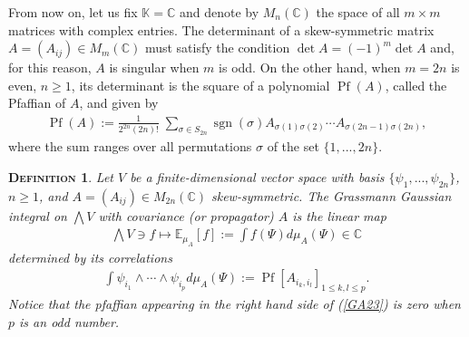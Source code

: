 \documentclass[12pt,twoside]{amsart}
\newcommand{\E}{{\mathbb{E}}}
\newtheorem{defi}{\textsc{Definition}}[section]
\numberwithin{equation}{section}
\begin{document}
From now on, let us fix $\mathbb{K} = \mathbb{C}$ and denote by $M_{n}(\mathbb{C})$ the space of all $m \times m$ matrices with complex entries. The determinant of a skew-symmetric matrix $A = (A_{ij}) \in M_{m}(\mathbb{C})$ must satisfy the condition $\det A = (-1)^{m}\det A$ and, for this reason, $A$ is singular when $m$ is odd. On the other hand, when $m=2n$ is even, $n \ge 1$, its determinant is the square of a polynomial $\operatorname{Pf}(A)$, called the Pfaffian of $A$, and given by
\begin{eqnarray}
\operatorname{Pf}(A) := \frac{1}{2^{2n}(2n)!}\;\sum_{\sigma \in S_{2n}}\operatorname{sgn}(\sigma)A_{\sigma(1)\sigma(2)}\cdots A_{\sigma(2n-1)\sigma(2n)}, \label{GA21}
\end{eqnarray}
where the sum ranges over all permutations $\sigma$ of the set $\{1,...,2n\}$. 

\begin{defi}
Let $V$ be a finite-dimensional vector space with basis $\{\psi_{1},...,\psi_{2n}\}$, $n \ge 1$, and $A = (A_{ij}) \in M_{2n}(\mathbb{C})$ skew-symmetric. The Grassmann Gaussian integral on $\bigwedge V$ with covariance (or propagator) $A$ is the linear map
\begin{eqnarray}
\bigwedge V \ni  f \mapsto \E_{\mu_{A}}[f] :=\int f(\Psi)d\mu_{A}(\Psi) \in \mathbb{C} \label{GA22}
\end{eqnarray}
determined by its correlations
\begin{eqnarray}
 \int \psi_{i_{1}}\wedge \cdots \wedge \psi_{i_{p}}d\mu_{A}(\Psi) := \operatorname{Pf}[A_{i_{k},i_{l}}]_{1 \le k,l \le p}. \label{GA23}
\end{eqnarray}
Notice that the pfaffian appearing in the right hand side of (\ref{GA23}) is zero when $p$ is an odd number. 
\end{defi}
\end{document}

